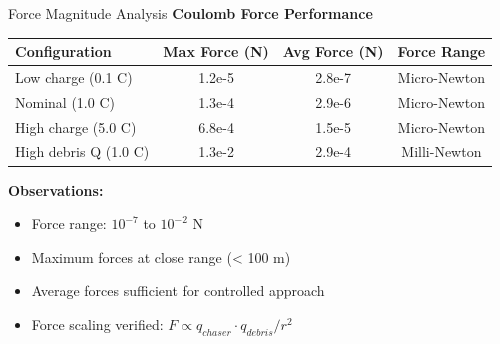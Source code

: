 \documentclass[aspectratio=169]{beamer}
\begin{document}
\begin{frame}{Force Magnitude Analysis}
\textbf{Coulomb Force Performance}

\vspace{0.5em}
\begin{table}
\footnotesize
\begin{tabular}{lccc}
\toprule
\textbf{Configuration} & \textbf{Max Force (N)} & \textbf{Avg Force (N)} & \textbf{Force Range} \\
\midrule
Low charge (0.1 C) & 1.2e-5 & 2.8e-7 & Micro-Newton \\
Nominal (1.0 C) & 1.3e-4 & 2.9e-6 & Micro-Newton \\
High charge (5.0 C) & 6.8e-4 & 1.5e-5 & Micro-Newton \\
High debris Q (1.0 C) & 1.3e-2 & 2.9e-4 & Milli-Newton \\
\bottomrule
\end{tabular}
\end{table}

\vspace{1em}
\textbf{Observations:}
\begin{itemize}
    \item Force range: $10^{-7}$ to $10^{-2}$ N
    \item Maximum forces at close range (< 100 m)
    \item Average forces sufficient for controlled approach
    \item Force scaling verified: $F \propto q_{chaser} \cdot q_{debris} / r^2$
\end{itemize}
\end{frame}
\end{document}
